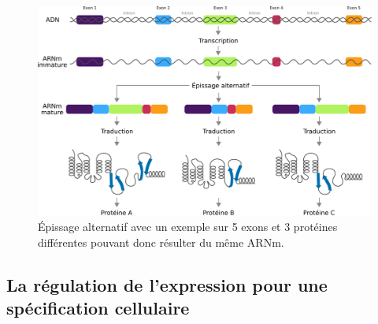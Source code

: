 \begin{figure}
    \centering
    \includegraphics[width=\textwidth]{img/intro/1_context/intro_1_alternative_splicing.pdf}
    \caption{Épissage alternatif avec un exemple sur 5 exons et 3 protéines différentes pouvant donc résulter du même ARNm.}
    \label{fig:alternative_splicing}
\end{figure}

\subsection{La régulation de l'expression pour une spécification cellulaire}

